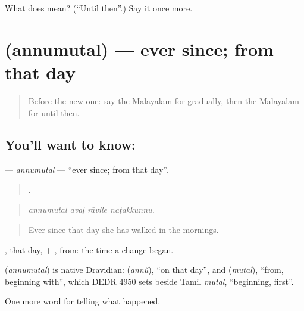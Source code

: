 \begin{tcolorbox}[breakable,colback=teal!4,colframe=teal!35!black,title={Before you move on}]
What does  mean? (\textquotedblleft{}Until then\textquotedblright{}.) Say it once more.
\end{tcolorbox}
\section[\texorpdfstring{\ml{അന്നുമുതൽ} (annumutal)}{അന്നുമുതൽ (annumutal)}]{ (annumutal) — ever since; from that day}

\label{lesson:ML-C357-annumutal}



\begin{quote}
Before the new one: say the Malayalam for gradually, then the Malayalam for until then.
\end{quote}

\subsection*{You'll want to know: }
\textbf{} — \emph{annumutal} — \textquotedblleft{}ever since; from that day\textquotedblright{}.

\begin{quote}
   .
\end{quote}

\begin{quote}
\emph{annumutal avaḷ rāvile naṭakkunnu.}
\end{quote}

\begin{quote}
Ever since that day she has walked in the mornings.
\end{quote}

, that day, + , from: the time a change began.

\begin{cousinweb}
\textbf{} (\emph{annumutal}) is native Dravidian:  (\emph{annŭ}), \textquotedblleft{}on that day\textquotedblright{}, and  (\emph{mutal}), \textquotedblleft{}from, beginning with\textquotedblright{}, which DEDR 4950 sets beside Tamil \emph{mutal}, \textquotedblleft{}beginning, first\textquotedblright{}.
\end{cousinweb}

\begin{grammarlens}[title={What you've built}]
One more word for telling what happened.
\end{grammarlens}

